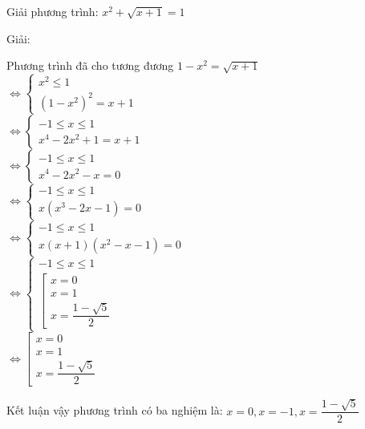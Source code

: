\begin{vd}
  Giải phương trình: $ x^2 + \sqrt{x+1} =1 $
\end{vd}
\begin{center}
    Giải:
\end{center}
Phương trình đã cho tương đương 
$ 1 - x^2  = \sqrt{x+1} $ \\

$ \Leftrightarrow 
    \begin{cases}
        x^2 \leq 1 \\
        (1 - x^2)^2 = x + 1
    \end{cases}
$ \\
$ \Leftrightarrow 
    \begin{cases}
      -1 \leq x \leq 1 \\
      x^4 - 2x^2 + 1 = x + 1
    \end{cases}
$ \\
$ \Leftrightarrow 
    \begin{cases}
      -1 \leq x \leq 1 \\
      x^4 -2x^2 -x =0
    \end{cases}
$ \\
$ \Leftrightarrow 
    \begin{cases}
      -1 \leq x \leq 1 \\
      x(x^3 -2x -1) = 0
    \end{cases}
$ \\
$ \Leftrightarrow 
    \begin{cases}
      -1 \leq x \leq 1 \\
      x(x+1)(x^2 -x -1) = 0
    \end{cases}
$ \\
$ \Leftrightarrow 
    \begin{cases}
      -1 \leq x \leq 1 \\
    \left[ 
        \begin{array}{l}
            x=0 \\
            x=1 \\
            x= \dfrac{1-\sqrt{5}}{2}
        \end{array}
    \right.
    \end{cases}
$\\
$ \Leftrightarrow 
    \left[ 
        \begin{array}{l}
            x=0 \\
            x=1 \\
            x= \dfrac{1-\sqrt{5}}{2}
        \end{array}
    \right.
$

Kết luận vậy phương trình có ba nghiệm là: $ x=0, x= -1, x=\dfrac{1-\sqrt{5}}{2}$

